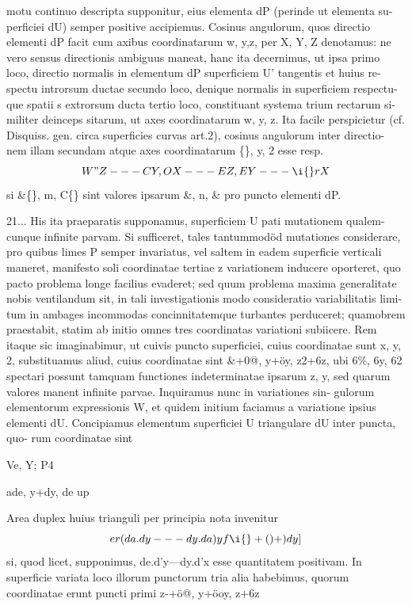 \documentclass[12pt,a4paper]{article}
\begin{document}
motu continuo descripta supponitur, eius elementa dP (perinde ut elementa su-
perficiei dU) semper positive accipiemus.     Cosinus angulorum, quos directio
elementi dP facit cum axibus coordinatarum w, y,z, per X, Y, Z denotamus:
ne vero sensus directionis ambiguus maneat, hanc ita decernimus, ut ipsa primo
loco, directio normalis in elementum dP superficiem U' tangentis et huius re-
spectu introrsum ductae secundo loco, denique normalis in superficiem respectu-
que spatii s extrorsum ducta tertio loco, constituant systema trium rectarum si-
militer deinceps sitarum, ut axes coordinatarum w, y, z. Ita facile perspicietur
(cf. Disquiss. gen. circa superficies curvas art.2), cosinus angulorum inter directio-
nem illam secundam atque axes coordinatarum \textregistered\{\}, y, 2 esse resp.
\[                    W"Z---CY,       OX---EZ,          EY---\i\{\}rX\]
si \&\textdegree\{\}, m, C\textdegree\{\} sint valores ipsarum \&, n, \& pro puncto elementi         dP.

21...
His ita praeparatis supponamus,       superficiem     U pati mutationem   qualem-
cunque infinite parvam.    Si sufficeret, tales tantummodöd mutationes considerare,
pro quibus limes P semper invariatus, vel saltem in eadem superficie verticali
maneret, manifesto soli coordinatae tertiae z variationem inducere oporteret, quo
pacto problema longe facilius evaderet; sed quum problema maxima generalitate
nobis ventilandum sit, in tali investigationis modo consideratio variabilitatis limi-
tum in ambages incommodas concinnitatemque turbantes perduceret; quamobrem
praestabit, statim ab initio omnes tres coordinatas variationi subiicere.       Rem
itaque sic imaginabimur, ut cuivis puncto superficiei, cuius coordinatae sunt
x, y, 2, substituamus aliud, cuius coordinatae sint \&+0@, y+öy, z2+6z,              ubi
6\%, 6y, 62 spectari possunt tamquam functiones indeterminatae ipsarum z, y,
sed quarum valores manent infinite parvae. Inquiramus nunc in variationes sin-
gulorum elementorum expressionis         W, et quidem initium faciamus a variatione
ipsius elementi dU.
Concipiamus elementum superficiei U triangulare dU              inter puncta, quo-
rum coordinatae sint

Ve,         Y;             P4




ade,        y+dy,          de up

Area duplex huius trianguli per principia nota invenitur
\[                    er (da.dy---dy.da)yf\i\{\}+()                   +)dy ]\]
si, quod licet, supponimus, de.d'y---dy.d'x esse quantitatem positivam.
In superficie variata loco illorum punctorum tria alia habebimus, quorum
coordinatae erunt
puncti primi             z-+ö@,         y+öoy,      z+6z
\end{document}
